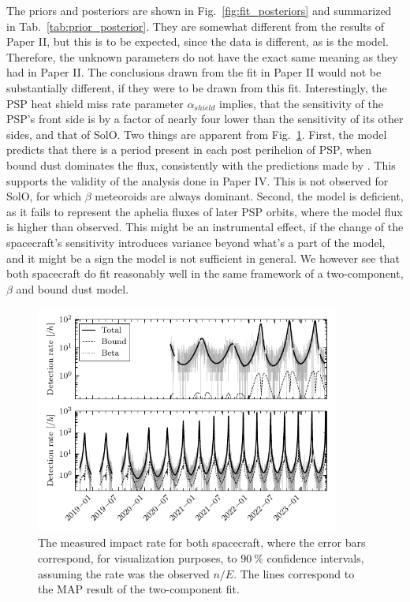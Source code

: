 The priors and posteriors are shown in Fig.~\ref{fig:fit_posteriors} and summarized in Tab.~\ref{tab:prior_posterior}. They are somewhat different from the results of Paper II, but this is to be expected, since the data is different, as is the model. Therefore, the unknown parameters do not have the exact same meaning as they had in Paper II. The conclusions drawn from the fit in Paper II would not be substantially different, if they were to be drawn from this fit. Interestingly, the PSP heat shield miss rate parameter $\alpha_{shield}$ implies, that the sensitivity of the PSP's front side is by a factor of nearly four lower than the sensitivity of its other sides, and that of SolO. Two things are apparent from Fig.~\ref{fig:fit_rate}. First, the model predicts that there is a period present in each post perihelion of PSP, when bound dust dominates the flux, consistently with the predictions made by \citep{szalay2020near,szalay2021collisional}. This supports the validity of the analysis done in Paper IV. This is not observed for SolO, for which $\beta$ meteoroids are always dominant. Second, the model is deficient, as it fails to represent the aphelia fluxes of later PSP orbits, where the model flux is higher than observed. This might be an instrumental effect, if the change of the spacecraft's sensitivity introduces variance beyond what's a part of the model, and it might be a sign the model is not sufficient in general. We however see that both spacecraft do fit reasonably well in the same framework of a two-component, $\beta$ and bound dust model. 

\begin{figure}[h]
 	\centering
 	\includegraphics[width=10cm]{figures/both_shield_rate_log.pdf}
 	\caption{The measured impact rate for both spacecraft, where the error bars correspond, for visualization purposes, to $\SI{90}{\%}$ confidence intervals, assuming the rate was the observed $n/E$. The lines correspond to the MAP result of the two-component fit.}
 	\label{fig:fit_rate}
\end{figure}







